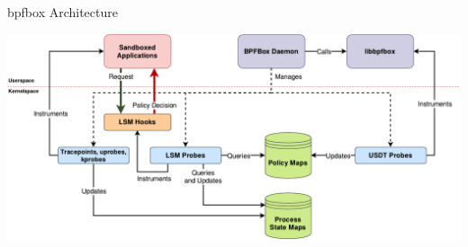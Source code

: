 \documentclass[12pt, dvipsnames, aspectratio=169]{beamer}
\begin{document}
\begin{frame}[c]{bpfbox Architecture}
\begin{center}
    \color{black}
    \includegraphics[width=1\textwidth]{figs/bpfbox-overview.pdf}
\end{center}
\end{frame}

%
%
%
\end{document}

